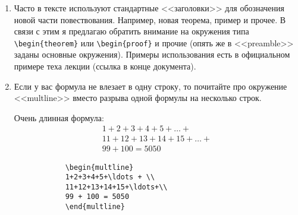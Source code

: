 \begin{enumerate}
\begin{table*}[!ht]
\begin{multicols}{2}
			\columnbreak
			\begin{verbatim}
			\sum (\sum\limits_{k = 0}^n 
			(e^{-\ln k + 2\ln\ln k}))
			\end{verbatim}
		\end{multicols}
		
	\end{table*}
	
	
	\begin{table}[!ht]
		И еще пример (\verb|\left, \right| можно использовать с любыми скобками):
		$$
		\lim_{n \to \infty}P\brackets{\left|\frac{\sum\limits_{i = 1}^{n}\xi_i - \E\brackets{\sum\limits_{i = 1}^{n}\xi_i}}{n^{\frac{1}{2} + \delta}}\right| > \epsilon} = 0 \Longleftrightarrow 
		\lim_{n \to \infty}P(|\frac{\sum\limits_{i = 1}^{n}\xi_i - \E(\sum\limits_{i = 1}^{n}\xi_i)}{n^{\frac{1}{2} + \delta}}| > \epsilon) = 0
		$$
	\end{table}
	
	\item Часто в тексте используют стандартные <<заголовки>> для обозначения новой части повествования.
	Например, новая теорема, пример и прочее. 
	В связи с этим я предлагаю обратить внимание на окружения типа \verb|\begin{theorem}| или \verb|\begin{proof}|  и прочие (опять же в <<preamble>> заданы основные окружения). Примеры использования есть в официальном примере теха лекции (ссылка в конце документа). 
	
	\item Если у вас формула не влезает в одну строку, то почитайте про окружение <<multline>> вместо разрыва одной формулы на несколько строк.
	\begin{table}[!ht]
		\begin{multicols}{2}
			Очень длинная формула:
			\begin{multline}
			1 + 2 + 3 + 4 + 5 + \ldots + \\
			11 + 12 +13 + 14 + 15 + \ldots + \\ 
			99 + 100 = 5050
			\end{multline}
			
			\columnbreak
			
			\begin{verbatim}
			\begin{multline}
			1+2+3+4+5+\ldots + \\
			11+12+13+14+15+\ldots+\\ 
			99 + 100 = 5050
			\end{multline}
			\end{verbatim}
		\end{multicols}
	\end{table}
	

\end{enumerate}
